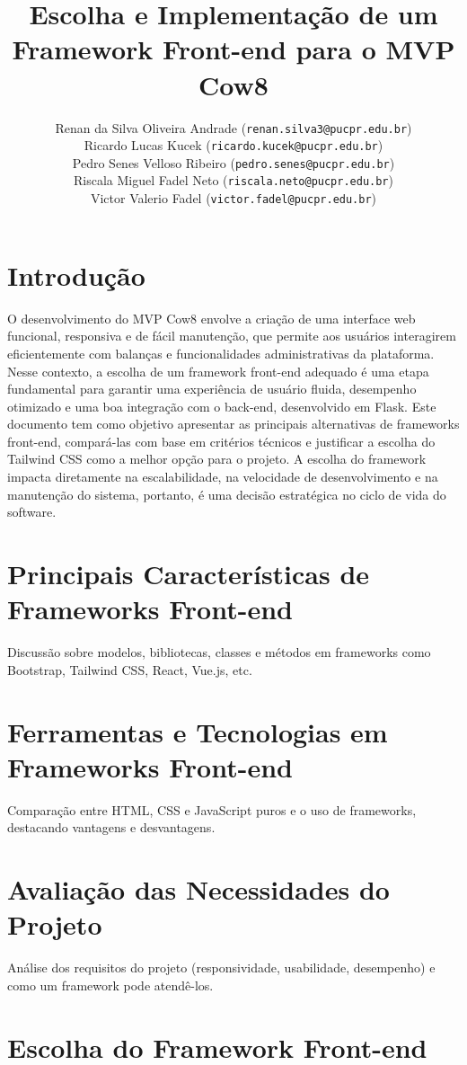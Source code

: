 \documentclass[11pt]{article}
\title{\textbf{Escolha e Implementação de um Framework Front-end para o MVP Cow8}}
\author{
    Renan da Silva Oliveira Andrade (\texttt{renan.silva3@pucpr.edu.br})\\
    Ricardo Lucas Kucek (\texttt{ricardo.kucek@pucpr.edu.br})\\
    Pedro Senes Velloso Ribeiro (\texttt{pedro.senes@pucpr.edu.br})\\
    Riscala Miguel Fadel Neto (\texttt{riscala.neto@pucpr.edu.br})\\
    Victor Valerio Fadel (\texttt{victor.fadel@pucpr.edu.br})
}
\begin{document}
\maketitle

\section{Introdução}

O desenvolvimento do MVP Cow8 envolve a criação de uma interface web funcional, responsiva e de fácil manutenção, que permite aos usuários interagirem eficientemente com balanças e funcionalidades administrativas da plataforma. Nesse contexto, a escolha de um framework front-end adequado é uma etapa fundamental para garantir uma experiência de usuário fluida, desempenho otimizado e uma boa integração com o back-end, desenvolvido em Flask. Este documento tem como objetivo apresentar as principais alternativas de frameworks front-end, compará-las com base em critérios técnicos e justificar a escolha do Tailwind CSS como a melhor opção para o projeto. A escolha do framework impacta diretamente na escalabilidade, na velocidade de desenvolvimento e na manutenção do sistema, portanto, é uma decisão estratégica no ciclo de vida do software.

\section{Principais Características de Frameworks Front-end}

Discussão sobre modelos, bibliotecas, classes e métodos em frameworks como Bootstrap, Tailwind CSS, React, Vue.js, etc.

\section{Ferramentas e Tecnologias em Frameworks Front-end}

Comparação entre HTML, CSS e JavaScript puros e o uso de frameworks, destacando vantagens e desvantagens.

\section{Avaliação das Necessidades do Projeto}

Análise dos requisitos do projeto (responsividade, usabilidade, desempenho) e como um framework pode atendê-los.

\section{Escolha do Framework Front-end}
\end{document}
